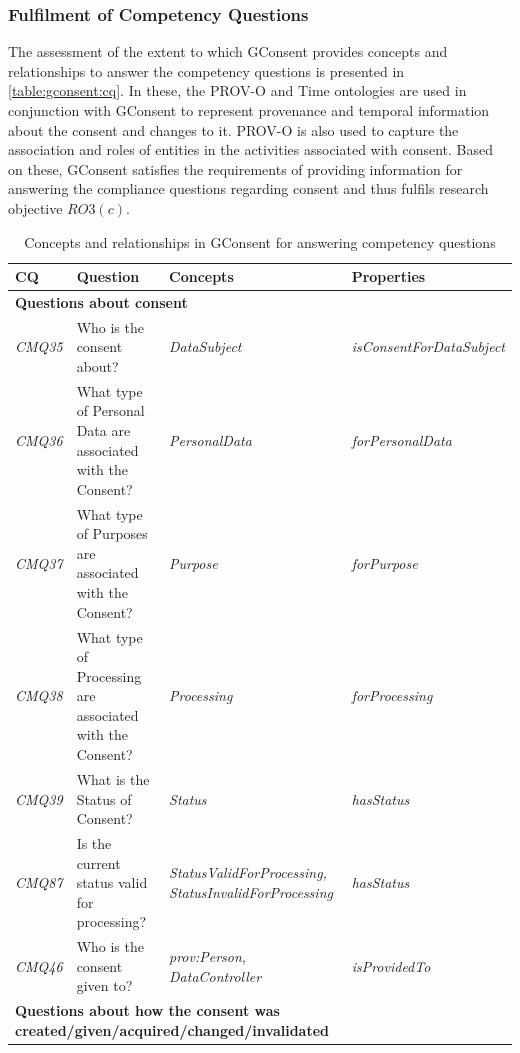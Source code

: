 \subsubsection{Fulfilment of Competency Questions}
The assessment of the extent to which GConsent provides concepts and relationships to answer the competency questions is presented in \autoref{table:gconsent:cq}. 
In these, the PROV-O and Time ontologies are used in conjunction with GConsent to represent provenance and temporal information about the consent and changes to it.
PROV-O is also used to capture the association and roles of entities in the activities associated with consent.
Based on these, GConsent satisfies the requirements of providing information for answering the compliance questions regarding consent and thus fulfils research objective $RO3(c)$.
\begin{table}[htbp]
\footnotesize
\centering
{}
\begin{tabularx}{\textwidth}{|p{1cm}|X|p{4cm}|p{3.5cm}|}
\caption{Concepts and relationships in GConsent for answering competency questions} \\ \hline
\textbf{CQ} & \textbf{Question} & \textbf{Concepts} & \textbf{Properties} \\ \hline
\multicolumn{4}{|l|}{\textbf{Questions about consent}} \\ \hline
\textit{CMQ35} & Who is the consent about? & \textit{DataSubject} & \textit{isConsentForDataSubject} \\ \hline
\textit{CMQ36} & What type of Personal Data are associated with the Consent? & \textit{PersonalData} & \textit{forPersonalData} \\ \hline
\textit{CMQ37} & What type of Purposes are associated with the Consent? & \textit{Purpose} & \textit{forPurpose} \\ \hline
\textit{CMQ38} & What type of Processing are associated with the Consent? & \textit{Processing} & \textit{forProcessing} \\ \hline
\textit{CMQ39} & What is the Status of Consent? & \textit{Status} & \textit{hasStatus} \\ \hline
\textit{CMQ87} & Is the current status valid for processing? & \textit{StatusValidForProcessing, StatusInvalidForProcessing} & \textit{hasStatus} \\ \hline
\textit{CMQ46} & Who is the consent given to? & \textit{prov:Person, DataController} & \textit{isProvidedTo} \\ \hline
\multicolumn{4}{|l|}{\textbf{Questions about how the consent was created/given/acquired/changed/invalidated}} \\ \hline

\end{tabularx}
\end{table}

